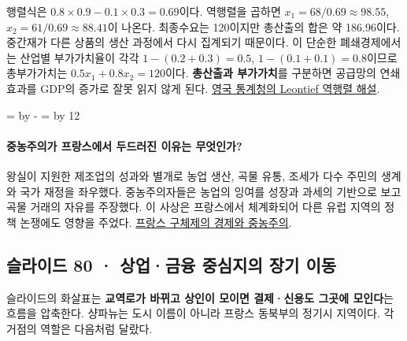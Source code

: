 \documentclass[10pt,a4paper]{article}
\newcommand{\ReserveQuestionSpace}{%
  \par\begingroup
  \dimen0=\pagegoal \advance\dimen0 by -\pagetotal
  \dimen2=\baselineskip \multiply\dimen2 by 12
  \ifdim\dimen0<\dimen2 \newpage\fi
  \endgroup}
\begin{document}
행렬식은 $0.8\times0.9-0.1\times0.3=0.69$이다. 역행렬을 곱하면 $x_1=68/0.69\approx98.55$, $x_2=61/0.69\approx88.41$이 나온다. 최종수요는 120이지만 총산출의 합은 약 186.96이다. 중간재가 다른 상품의 생산 과정에서 다시 집계되기 때문이다. 이 단순한 폐쇄경제에서는 산업별 부가가치율이 각각 $1-(0.2+0.3)=0.5$, $1-(0.1+0.1)=0.8$이므로 총부가가치는 $0.5x_1+0.8x_2=120$이다. \textbf{총산출과 부가가치}를 구분하면 공급망의 연쇄효과를 GDP의 증가로 잘못 읽지 않게 된다. \href{https://www.ons.gov.uk/economy/nationalaccounts/supplyandusetables/articles/inputoutputanalyticaltables/guidanceforuse}{영국 통계청의 Leontief 역행렬 해설}.\par

\ReserveQuestionSpace
\paragraph{중농주의가 프랑스에서 두드러진 이유는 무엇인가?}
왕실이 지원한 제조업의 성과와 별개로 농업 생산, 곡물 유통, 조세가 다수 주민의 생계와 국가 재정을 좌우했다. 중농주의자들은 농업의 잉여를 성장과 과세의 기반으로 보고 곡물 거래의 자유를 주장했다. 이 사상은 프랑스에서 체계화되어 다른 유럽 지역의 정책 논쟁에도 영향을 주었다. \href{https://www.larousse.fr/encyclopedie/divers/Ancien\_R\%C3\%A9gime/105343}{프랑스 구체제의 경제와 중농주의}.\par

\subsection{슬라이드 80 · 상업·금융 중심지의 장기 이동}
슬라이드의 화살표는 \textbf{교역로가 바뀌고 상인이 모이면 결제·신용도 그곳에 모인다}는 흐름을 압축한다. 샹파뉴는 도시 이름이 아니라 프랑스 동북부의 정기시 지역이다. 각 거점의 역할은 다음처럼 달랐다.\par
\end{document}
